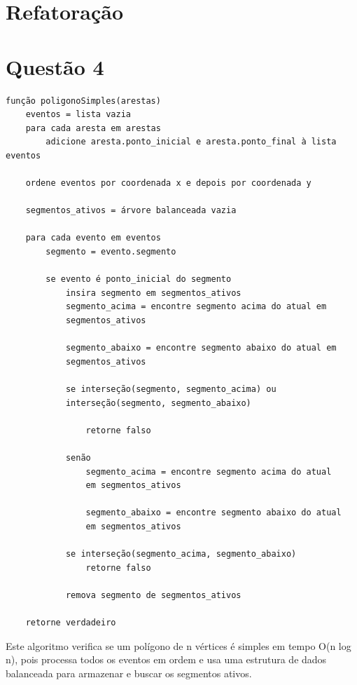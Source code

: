 \documentclass[12pt]{article}
\begin{document}
\section{Refatoração}

\par 
\newpage
\section{Questão 4}
\begin{verbatim}
função poligonoSimples(arestas)
	eventos = lista vazia
	para cada aresta em arestas
		adicione aresta.ponto_inicial e aresta.ponto_final à lista eventos

	ordene eventos por coordenada x e depois por coordenada y

	segmentos_ativos = árvore balanceada vazia

	para cada evento em eventos
		segmento = evento.segmento
		
		se evento é ponto_inicial do segmento
			insira segmento em segmentos_ativos
			segmento_acima = encontre segmento acima do atual em
			segmentos_ativos

			segmento_abaixo = encontre segmento abaixo do atual em
			segmentos_ativos

			se interseção(segmento, segmento_acima) ou
			interseção(segmento, segmento_abaixo)
			
				retorne falso
				
			senão
				segmento_acima = encontre segmento acima do atual
				em segmentos_ativos
				
				segmento_abaixo = encontre segmento abaixo do atual
				em segmentos_ativos

			se interseção(segmento_acima, segmento_abaixo)
				retorne falso

			remova segmento de segmentos_ativos

	retorne verdadeiro
\end{verbatim}
\par Este algoritmo verifica se um polígono de n vértices é simples em tempo O(n log n), pois processa todos os eventos em ordem e usa uma estrutura de dados balanceada para armazenar e buscar os segmentos ativos.
\newpage
\end{document}

